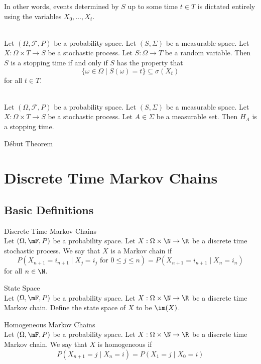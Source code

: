 \documentclass[a4paper]{article}
\begin{document}
In other words, events determined by $S$ up to some time $t\in T$ is dictated entirely using the variables $X_0,\dots,X_t$. 

\begin{lmm}{}{}\\
Let $(\Omega,\mathcal{F},P)$ be a probability space. Let $(S,\Sigma)$ be a measurable space. Let $X:\Omega\times T\to S$ be a stochastic process. Let $S:\Omega\to T$ be a random variable. Then $S$ is a stopping time if and only if $S$ has the property that $$\{\omega\in\Omega\;|\;S(\omega)=t\}\subseteq\sigma(X_t)$$ for all $t\in T$. 
\end{lmm}

\begin{crl}{}{}\\
Let $(\Omega,\mathcal{F},P)$ be a probability space. Let $(S,\Sigma)$ be a measurable space. Let $X:\Omega\times T\to S$ be a stochastic process. Let $A\in\Sigma$ be a measurable set. Then $H_A$ is a stopping time. 
\end{crl}

\begin{thm}{Début Theorem}{}
\end{thm}

\pagebreak
\section{Discrete Time Markov Chains}
\subsection{Basic Definitions}
\begin{defn}{Discrete Time Markov Chains}{}\\
Let $(\Omega,\mF,P)$ be a probability space. Let $X:\Omega\times\N\to\R$ be a discrete time stochastic process. We say that $X$ is a Markov chain if $$P(X_{n+1}=i_{n+1}\;|\;X_j=i_j\text{ for }0\leq j\leq n)=P(X_{n+1}=i_{n+1}\;|\;X_n=i_n)$$ for all $n\in\N$. 
\end{defn}

\begin{defn}{State Space}{}\\
Let $(\Omega,\mF,P)$ be a probability space. Let $X:\Omega\times\N\to\R$ be a discrete time Markov chain. Define the state space of $X$ to be $\im(X)$. 
\end{defn}

\begin{defn}{Homogeneous Markov Chains}{}\\
Let $(\Omega,\mF,P)$ be a probability space. Let $X:\Omega\times\N\to\R$ be a discrete time Markov chain. We say that $X$ is homogeneous if $$P(X_{n+1}=j\;|\;X_n=i)=P(X_1=j\;|\;X_0=i)$$
\end{defn}
\end{document}
